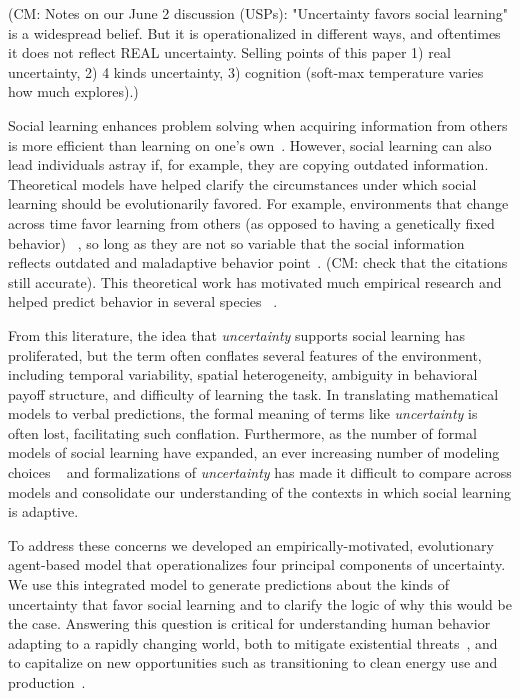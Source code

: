\documentclass[letterpaper,11.5pt]{scrartcl}
\newcommand{\cm}[1]{{\textcolor{mypurple} {({\tiny CM:} #1)}}}
\begin{document}
\cm{Notes on our June 2 discussion (USPs): "Uncertainty favors social learning" is a widespread belief. But it is operationalized in different ways, and oftentimes it does not reflect REAL uncertainty. Selling points of this paper 1) real uncertainty, 2) 4 kinds uncertainty, 3) cognition (soft-max temperature varies how much explores).}

Social learning enhances problem solving when acquiring information from others is more efficient than learning on one's own~\cite{Laland2004}. However, social learning can also lead individuals astray if, for example, they are copying outdated information. Theoretical models have helped clarify the circumstances under which social learning should be evolutionarily favored. For example, environments that change across time favor learning from others (as opposed to having a genetically fixed behavior) ~\cite{BoydRicherson1985,Henrich1998}, so long as they are not so variable that the social information reflects outdated and maladaptive behavior point~\cite{Rogers1988,Feldman1996}. \cm{check that the citations still accurate}. This theoretical work has motivated much empirical research and helped predict behavior in several species ~\cite{McElreath2005,Kendal2018,Allen2019}. 

From this literature, the idea that \emph{uncertainty} supports social learning has proliferated, but the term often conflates several features of the environment, including temporal variability,
spatial heterogeneity, ambiguity in behavioral payoff structure, and difficulty of learning the task.  In translating mathematical models to verbal predictions, the formal meaning of terms like \emph{uncertainty} is often lost, facilitating such conflation. Furthermore, as the number of formal models of social learning have expanded, an ever increasing number
of modeling choices ~\cite[Figure 1]{Kendal2018} and formalizations of \emph{uncertainty} has made it difficult to compare across models and consolidate our understanding of the contexts in which social learning is adaptive.  

To address these concerns we developed an empirically-motivated, evolutionary agent-based model that operationalizes four principal components of uncertainty. We use this integrated model to generate predictions about the kinds of uncertainty that favor social learning and to clarify the logic of why this would be the case. Answering this question is critical for understanding human behavior adapting to a rapidly changing world, both to mitigate existential threats~\cite{Moya2020,Jones2021}, and to capitalize on new opportunities such as transitioning to clean energy use and production~\cite{NatureEnergyEditorialPromisesPremises2018,Brisbois2022}.
\end{document}
